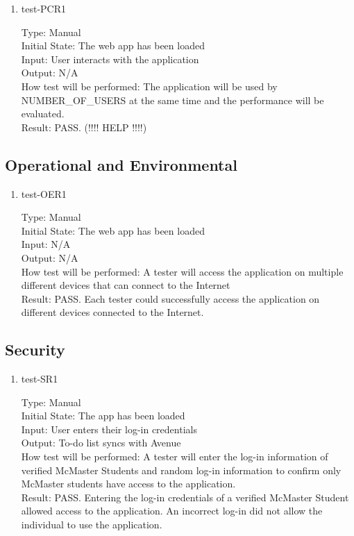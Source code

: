 \documentclass[12pt, titlepage]{article}
\begin{document}
\begin{enumerate}
\item{test-PCR1\\}

Type: Manual\\
Initial State: The web app has been loaded\\
Input: User interacts with the application\\
Output: N/A\\
How test will be performed: The application will be used by NUMBER\_OF\_USERS at the same time and the performance will be evaluated.\\
Result: PASS. (!!!! HELP !!!!)

\end{enumerate}

\subsection{Operational and Environmental}

\begin{enumerate}
\item{test-OER1\\}

Type: Manual\\
Initial State: The web app has been loaded\\
Input: N/A\\
Output: N/A\\
How test will be performed: A tester will access the application on multiple different devices that can connect to the Internet\\
Result: PASS. Each tester could successfully access the application on different devices connected to the Internet.

\end{enumerate}

\subsection{Security}

\begin{enumerate}
\item{test-SR1\\}

Type: Manual\\
Initial State: The app has been loaded\\
Input: User enters their log-in credentials\\
Output: To-do list syncs with Avenue\\
How test will be performed: A tester will enter the log-in information of verified McMaster Students and random log-in information to confirm only McMaster students have access to the application.\\
Result: PASS. Entering the log-in credentials of a verified McMaster Student allowed access to the application. An incorrect log-in did not allow the individual to use the application. 

\end{enumerate}
\end{document}
